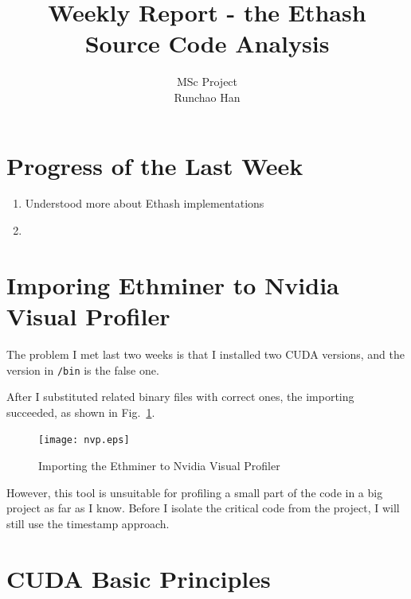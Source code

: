 \documentclass[11pt]{article}
\begin{document}
\title{Weekly Report - the Ethash Source Code Analysis}
\author{MSc Project \\
Runchao Han \\
}
\maketitle
%
%

\section{Progress of the Last Week}

\begin{enumerate}
\item Understood more about Ethash implementations
\item 
\end{enumerate}

\section{Imporing Ethminer to Nvidia Visual Profiler}

The problem I met last two weeks is that I installed two CUDA versions, and the version in \texttt{/bin} is the false one.

After I substituted related binary files with correct ones, the importing succeeded, as shown in Fig.~\ref{fig:nvp}.

\begin{figure}[h]
    \centering
    \texttt{[image: nvp.eps]}
    \caption{Importing the Ethminer to Nvidia Visual Profiler}
    \label{fig:nvp}
\end{figure}

However, this tool is unsuitable for profiling a small part of the code in a big project as far as I know. Before I isolate the critical code from the project, I will still use the timestamp approach.

\section{CUDA Basic Principles}
\end{document}

